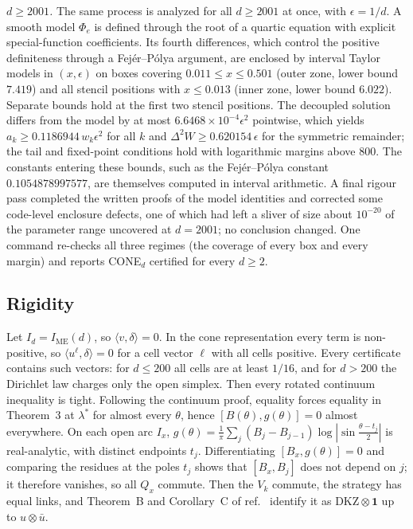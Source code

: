 \documentclass[11pt]{article}
\newcommand{\one}{\mathbf{1}}
\newcommand{\IME}{I_{\mathrm{ME}}}
\begin{document}
\emph{$d\ge2001$.} The same process is analyzed for all $d\ge2001$ at once, with $\epsilon=1/d$. A smooth model $\Phi_e$
is defined through the root of a quartic equation with explicit special-function coefficients. Its fourth
differences, which control the positive definiteness through a Fej\'er--P\'olya argument, are enclosed by interval
Taylor models in $(x,\epsilon)$ on boxes covering $0.011\le x\le0.501$ (outer zone, lower bound $7.419$) and all stencil
positions with $x\le0.013$ (inner zone, lower bound $6.022$). Separate bounds hold at the first two stencil positions.
The decoupled solution differs from the model by at most $6.6468\times10^{-4}\epsilon^2$ pointwise, which yields
$a_k\ge0.1186944\,w_k\epsilon^2$ for all $k$ and $\Delta^2W\ge0.620154\,\epsilon$ for the symmetric remainder; the tail
and fixed-point conditions hold with logarithmic margins above $800$. The constants entering these bounds, such as the
Fej\'er--P\'olya constant $0.1054878997577$, are themselves computed in interval arithmetic. A final rigour pass completed
the written proofs of the model identities and corrected some code-level enclosure defects, one of which had left a
sliver of size about $10^{-20}$ of the parameter range uncovered at $d=2001$; no conclusion changed. One command re-checks
all three regimes (the coverage of every box and every margin) and reports CONE$_d$ certified for every $d\ge2$.

\subsection*{Rigidity}
Let $I_d=\IME(d)$, so $\langle v,\delta\rangle=0$. In the cone representation every term is non-positive, so
$\langle u^\ell,\delta\rangle=0$ for a cell vector $\ell$ with all cells positive. Every certificate contains such
vectors: for $d\le200$ all cells are at least $1/16$, and for $d>200$ the Dirichlet law charges only the open simplex.
Then every rotated continuum inequality is tight. Following the continuum proof, equality forces equality in
Theorem~3 at $\lambda^*$ for almost every $\theta$, hence $[B(\theta),g(\theta)]=0$ almost everywhere. On each open arc
$I_x$, $g(\theta)=\frac1\pi\sum_j(B_j-B_{j-1})\log|\sin\frac{\theta-t_j}{2}|$ is real-analytic, with distinct endpoints
$t_j$. Differentiating $[B_x,g(\theta)]=0$ and comparing the residues at the poles $t_j$ shows that $[B_x,B_j]$ does not
depend on $j$; it therefore vanishes, so all $Q_x$ commute. Then the $V_k$ commute, the strategy has equal links, and
Theorem~B and Corollary~C of ref.~ identify it as $\mathrm{DKZ}\otimes\one$ up to $u\otimes\bar u$.
\end{document}
